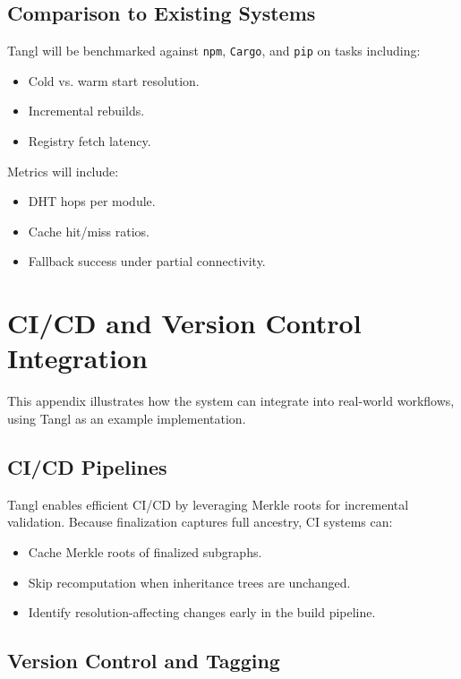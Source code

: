 \documentclass[sigplan,screen]{acmart}
\begin{document}
\subsection{Comparison to Existing Systems}

Tangl will be benchmarked against \texttt{npm}, \texttt{Cargo}, and \texttt{pip} on tasks including:

\begin{itemize}
  \item Cold vs. warm start resolution.
  \item Incremental rebuilds.
  \item Registry fetch latency.
\end{itemize}

Metrics will include:

\begin{itemize}
  \item DHT hops per module.
  \item Cache hit/miss ratios.
  \item Fallback success under partial connectivity.
\end{itemize}

\section{CI/CD and Version Control Integration}
\label{appendix:ci-vcs}

This appendix illustrates how the system can integrate into real-world workflows, using Tangl as an example implementation.

\subsection{CI/CD Pipelines}

Tangl enables efficient CI/CD by leveraging Merkle roots for incremental validation. Because finalization captures full ancestry, CI systems can:

\begin{itemize}
  \item Cache Merkle roots of finalized subgraphs.
  \item Skip recomputation when inheritance trees are unchanged.
  \item Identify resolution-affecting changes early in the build pipeline.
\end{itemize}

\subsection{Version Control and Tagging}
\end{document}
